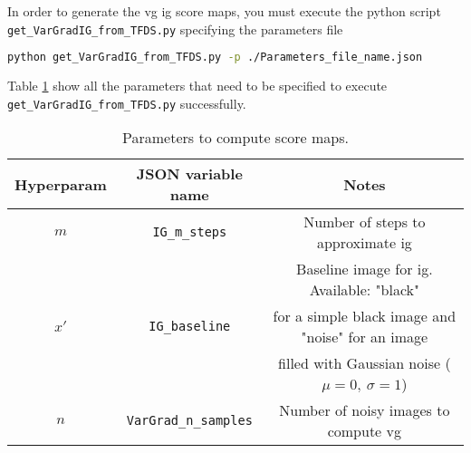 
In order to generate the \acrlong{vg} \acrlong{ig} score maps, you must execute the python script \texttt{get\_VarGradIG\_from\_TFDS.py} specifying the parameters file
\begin{lstlisting}[language=Bash]
python get_VarGradIG_from_TFDS.py -p ./Parameters_file_name.json
\end{lstlisting}

Table \ref{table:imp_notes:VGIG_params} show all the parameters that need to be specified to execute \texttt{get\_VarGradIG\_from\_TFDS.py} successfully.

\begin{table}[h!]
  \centering
  \begin{tabular}{c|c|c}
    Hyperparam & JSON variable name & Notes \\
    \hline
    $m$ & \texttt{IG\_m\_steps} & Number of steps to approximate \gls{ig} \\
    \hline
     &  & Baseline image for \gls{ig}. Available: "black" \\
    $x'$ &  \texttt{IG\_baseline} & for a simple black image and "noise" for an image \\
     &  &  filled with Gaussian noise ($\mu=0,\ \sigma=1$) \\
    \hline
    $n$ & \texttt{VarGrad\_n\_samples} & Number of noisy images to compute \gls{vg} \\
    \hline
  \end{tabular}
  \caption{Parameters to compute score maps.}
  \label{table:imp_notes:VGIG_params}
\end{table}
